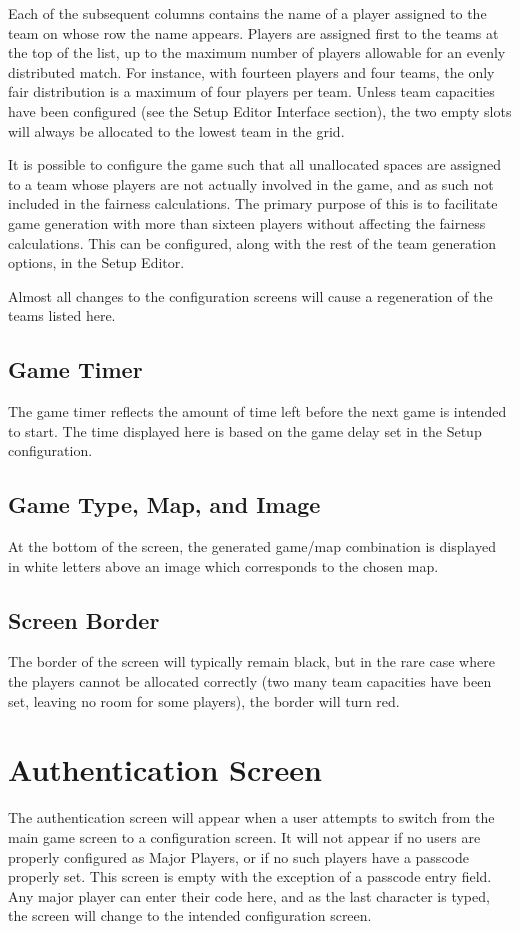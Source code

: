 \documentclass[pdftex,10pt,a4paper]{report}
\begin{document}
Each of the subsequent columns contains the name of a player assigned to the team on whose row the name appears.  Players are assigned first to the teams at the top of the list, up to the maximum number of players allowable for an evenly distributed match.  For instance, with fourteen players and four teams, the only fair distribution is a maximum of four players per team.  Unless team capacities have been configured (see the Setup Editor Interface section), the two empty slots will always be allocated to the lowest team in the grid.

It is possible to configure the game such that all unallocated spaces are assigned to a team whose players are not actually involved in the game, and as such not included in the fairness calculations.  The primary purpose of this is to facilitate game generation with more than sixteen players without affecting the fairness calculations.  This can be configured, along with the rest of the team generation options, in the Setup Editor.

Almost all changes to the configuration screens will cause a regeneration of the teams listed here.

\subsection{Game Timer}
The game timer reflects the amount of time left before the next game is intended to start.  The time displayed here is based on the game delay set in the Setup configuration.

\subsection{Game Type, Map, and Image}
At the bottom of the screen, the generated game/map combination is displayed in white letters above an image which corresponds to the chosen map.

\subsection{Screen Border}
The border of the screen will typically remain black, but in the rare case where the players cannot be allocated correctly (two many team capacities have been set, leaving no room for some players), the border will turn red.

\section{Authentication Screen}
The authentication screen will appear when a user attempts to switch from the main game screen to a configuration screen.  It will not appear if no users are properly configured as Major Players, or if no such players have a passcode properly set.  This screen is empty with the exception of a passcode entry field.  Any major player can enter their code here, and as the last character is typed, the screen will change to the intended configuration screen.
\end{document}
